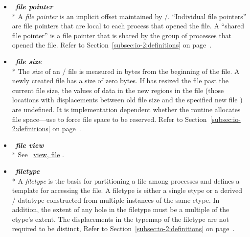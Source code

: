 \begin{itemize}
\label{glossary:file_pointer}
\item  ~\hypertarget{glossary:file_pointer}{\emph{\textbf{file pointer}}} \\*
A {\it file pointer} is an implicit offset maintained by \MPI/.
``Individual file pointers'' are file pointers that are local to
each process that opened the file.
A ``shared file pointer'' is a file pointer that is shared by
the group of processes that opened the file.
Refer to Section~\ref{subsec:io-2:definitions} on page~\pageref{subsec:io-2:definitions}.

\label{glossary:file_size}
\item  ~\hypertarget{glossary:file_size}{\emph{\textbf{file size}}} \\*
The {\it size} of an \MPI/ file is measured in bytes from the 
beginning of the file.  A newly created file has a size of zero 
bytes.  
If  has resized the file past the
current file size, the values of data in the new regions in the file (those
locations with displacements between old file size and the specified new file \textbf{})
are undefined.
It is implementation dependent whether the  routine
allocates file space---use 
to force file space to be reserved.
Refer to Section~\ref{subsec:io-2:definitions} on page~\pageref{subsec:io-2:definitions}.

\label{glossary:file_view}
\item  ~\hypertarget{glossary:file_view}{\emph{\textbf{file view}}} \\*
See ~\hyperlink{glossary:view_file}{view, file} .

\label{glossary:filetype}
\item  ~\hypertarget{glossary:filetype}{\emph{\textbf{filetype}}} \\*
A {\it filetype} is the basis for partitioning a file among processes
and defines a template for accessing the file.
A filetype is either a single etype or a derived \MPI/ datatype
constructed from multiple instances of the same etype.
In addition,
the extent of any hole in the filetype
must be a multiple of the etype's extent.
The displacements in the typemap of the filetype are not required to be distinct,
Refer to Section~\ref{subsec:io-2:definitions} on page~\pageref{subsec:io-2:definitions}.


\end{itemize}
